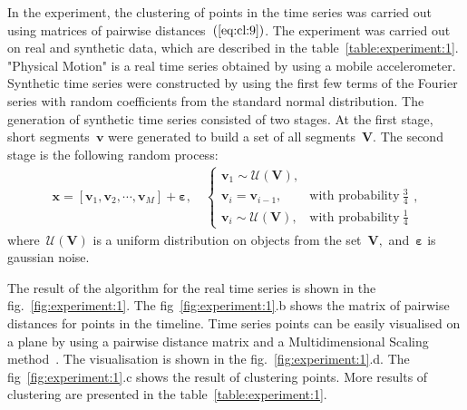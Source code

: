 \documentclass[12pt, twoside]{article}
\numberwithin{equation}{section}
\begin{document}
In the experiment, the clustering of points in the time series was carried out using matrices of pairwise distances~$(\ref{eq:cl:9})$. 
The experiment was carried out on real and synthetic data, which are described in the table~\ref{table:experiment:1}. 
"Physical Motion" is a real time series obtained by using a mobile accelerometer. 
Synthetic time series were constructed by using the first few terms of the Fourier series with random coefficients from the standard normal distribution.
The generation of synthetic time series consisted of two stages.
At the first stage, short segments~$\textbf{v}$ were generated to build a set of all segments~$\mathbf{V}$.
The second stage is the following random process:
\begin{equation}
\label{eq:exp:1}
\begin{aligned}
\textbf{x} = [\textbf{v}_{1}, \textbf{v}_{2}, \cdots, \textbf{v}_{M}] + \bm{\varepsilon}, \quad \begin{cases}
    \textbf{v}_{1} \sim \mathcal{U}\left(\mathbf{V}\right),\\
    \textbf{v}_{i} = \textbf{v}_{i - 1}, & \text{with probability}~\frac{3}{4}\\
    \textbf{v}_{i} \sim \mathcal{U}\left(\mathbf{V}\right), & \text{with probability}~\frac{1}{4}
\end{cases},
\end{aligned}
\end{equation}
where~$\mathcal{U}\left(\mathbf{V}\right)$ is a uniform distribution on objects from the set~$\mathbf{V},$ and~$\bm{\varepsilon}$ is gaussian noise.

The result of the algorithm for the real time series is shown in the fig.~\ref{fig:experiment:1}. The fig~\ref{fig:experiment:1}.b shows the matrix of pairwise distances for points in the timeline. Time series points can be easily visualised on a plane by using a pairwise distance matrix and a Multidimensional Scaling method~\cite{Borg2005}. The visualisation is shown in the fig.~\ref{fig:experiment:1}.d. The fig~\ref{fig:experiment:1}.c shows the result of clustering points. More results of clustering are presented in the table~\ref{table:experiment:1}.
\end{document}

